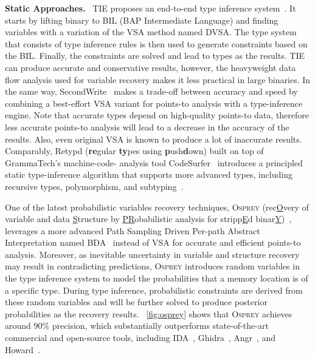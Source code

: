 \noindent\textbf{Static Approaches.}~
TIE proposes an end-to-end type inference system~\cite{lee2011tie}. It starts by lifting binary to BIL (BAP Intermediate Language) and finding variables with a variation of the VSA method named DVSA. The type system that consists of type inference rules is then used to generate constraints based on the BIL. Finally, the constraints are solved and lead to types as the results. TIE can produce accurate and conservative results, however, the heavyweight data flow analysis used for variable recovery makes it less practical in large binaries.
In the same way, SecondWrite~\cite{elwazeer2013scalable} makes a trade-off between accuracy and speed by combining a best-effort VSA variant for points-to analysis with a type-inference engine. Note that accurate types depend on high-quality points-to data, therefore less accurate points-to analysis will lead to a decrease in the accuracy of the results. Also, even original VSA is known to produce a lot of inaccurate results.
Comparably, Retypd (\textbf{re}gular \textbf{ty}pes using \textbf{p}ush\textbf{d}own) built on top of GrammaTech’s machine-code-
analysis tool CodeSurfer~\cite{balakrishnan2005codesurfer} introduces a principled static type-inference algorithm that supports more advanced types, including recursive types, polymorphism, and subtyping~\cite{noonan2016polymorphic}.

One of the latest probabilistic variables recovery techniques, \textsc{Osprey} (rec\underline{O}very of variable and data \underline{S}tructure by \underline{PR}obabilistic analysis for stripp\underline{E}d binar\underline{Y})~\cite{zhang2021osprey}, leverages a more advanced Path Sampling Driven Per-path Abstract Interpretation named BDA~\cite{zhang2019bda} instead of VSA for accurate and efficient points-to analysis. Moreover, as inevitable uncertainty in variable and structure recovery may result in contradicting predictions, \textsc{Osprey} introduces random variables in the type inference system to model the probabilities that a memory location is of a specific type. During type inference, probabilistic constraints are derived from these random variables and will be further solved to produce posterior probabilities as the recovery results. \F~\ref{fig:osprey} shows that \textsc{Osprey} achieves around 90\% precision, which substantially outperforms state-of-the-art commercial and open-source tools, including IDA~\cite{hex2014ida}, Ghidra~\cite{ghidra}, Angr~\cite{shoshitaishvili2016sok}, and Howard~\cite{slowinska2011howard}.

